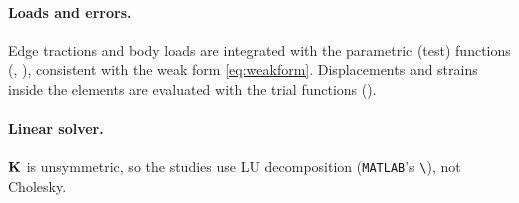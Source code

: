 \paragraph{Loads and errors.} Edge tractions and body loads are integrated with
the parametric (test) functions (, ), consistent with
the weak form \eqref{eq:weakform}. Displacements and strains inside the elements
are evaluated with the trial functions ().

\paragraph{Linear solver.} $\mathbf{K}$ is unsymmetric, so the studies use LU
decomposition (\texttt{MATLAB}'s \texttt{\textbackslash}), not Cholesky.
